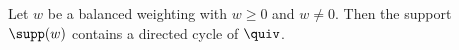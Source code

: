 \begin{lemma}[Support]\label{sh-0006}
Let $w$ be a balanced weighting with $w \geq 0$ and $w \neq 0$. Then the support $\supp(w)$ contains a directed cycle of $\quiv$.
\end{lemma}

